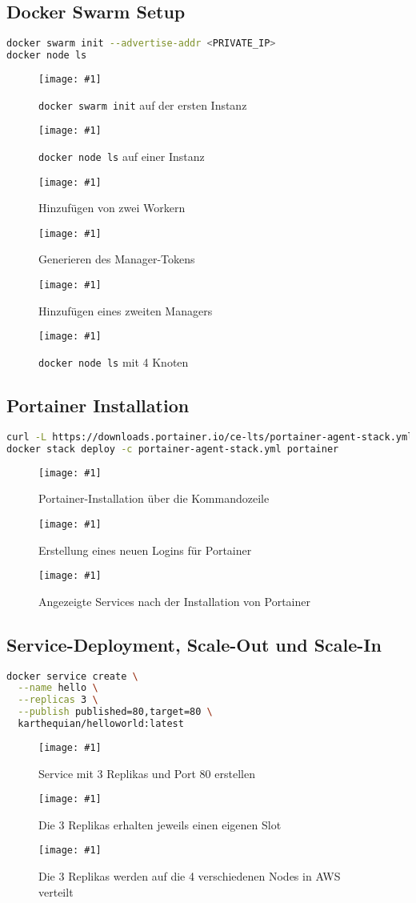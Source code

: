 \documentclass[BMR,Seminar,ngerman,IEEE]{twbook}
\newcommand{\screenshotH}[3]{%
  \begin{figure}[H]
    \centering
    \texttt{[image: \#1]}%
    \caption{#2}%
    \label{fig:#3}%
  \end{figure}%
}
\begin{document}
\subsection{Docker Swarm Setup}
\begin{lstlisting}[language=bash]
docker swarm init --advertise-addr <PRIVATE_IP>
docker node ls
\end{lstlisting}

\screenshotH{docker_swarm_init.png}{\texttt{docker swarm init} auf der ersten Instanz}{docker-swarm-init}
\FloatBarrier
\screenshotH{docker_node_ls.png}{\texttt{docker node ls} auf einer Instanz}{node-ls-1-instance}
\FloatBarrier
\screenshotH{join_worker.png}{Hinzufügen von zwei Workern}{add-two-worker}
\FloatBarrier
\screenshotH{manager_token.png}{Generieren des Manager-Tokens}{manager-token}
\FloatBarrier
\screenshotH{join_manager.png}{Hinzufügen eines zweiten Managers}{second-manager}
\FloatBarrier

\screenshotH{node-ls_all.png}{\texttt{docker node ls} mit 4 Knoten}{node-ls}
\FloatBarrier

\subsection{Portainer Installation}
\begin{lstlisting}[language=bash]
curl -L https://downloads.portainer.io/ce-lts/portainer-agent-stack.yml -o portainer-agent-stack.yml
docker stack deploy -c portainer-agent-stack.yml portainer
\end{lstlisting}

\screenshotH{portainer_installation.png}{Portainer-Installation über die Kommandozeile}{portainer-installation}
\FloatBarrier

\screenshotH{portainer_login.png}{Erstellung eines neuen Logins für Portainer}{new-login}
\FloatBarrier
\screenshotH{services.png}{Angezeigte Services nach der Installation von Portainer}{standard-services}
\FloatBarrier

\subsection{Service-Deployment, Scale-Out und Scale-In}
\begin{lstlisting}[language=bash]
docker service create \
  --name hello \
  --replicas 3 \
  --publish published=80,target=80 \
  karthequian/helloworld:latest
\end{lstlisting}
\screenshotH{portainer_create_service.png}{Service mit 3 Replikas und Port 80 erstellen}{create-service}
\FloatBarrier
\screenshotH{3_replicas.png}{Die 3 Replikas erhalten jeweils einen eigenen Slot}{three-replicas}
\FloatBarrier
\screenshotH{portainer_cluster_3rep.png}{Die 3 Replikas werden auf die 4 verschiedenen Nodes in AWS verteilt}{distribution-3-replicas}
\FloatBarrier
\end{document}

